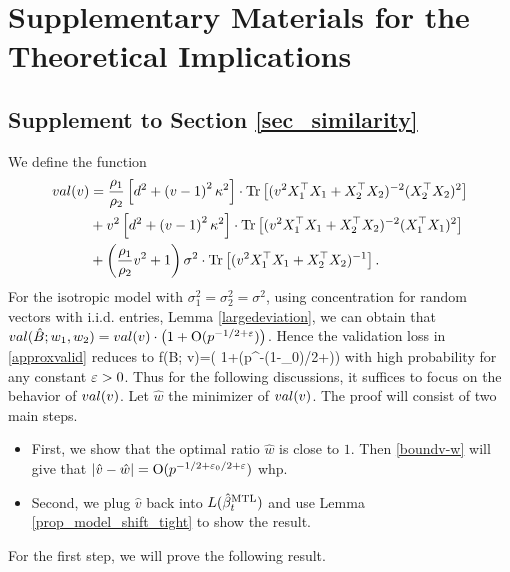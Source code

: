 \section{Supplementary Materials for the Theoretical Implications}

\subsection{Supplement to Section \ref{sec_similarity}}\label{app_proof_31}

We define the function
\begin{align}
	val(v) &= \frac{\rho_1}{\rho_2}\left[d^2 +\left( v-1\right)^2\kappa^2\right]\cdot \operatorname{Tr}\left[( v^2X_1^{\top}X_1 +X_2^{\top}X_2)^{-2} (X_2^{\top}X_2)^2\right] \nonumber \\
	& +  v^2\left[d^2 +\left( v-1\right)^2\kappa^2\right]\cdot \operatorname{Tr}\left[( v^2X_1^{\top}X_1 +X_2^{\top}X_2)^{-2} (X_1^{\top}X_1)^2\right] \nonumber\\
			& + \left(\frac{\rho_1}{\rho_2} v^2 + 1\right)\sigma^2 \cdot \operatorname{Tr}\left[(v^2X_1^{\top}X_1  + X_2^{\top}X_2)^{-1} \right]. \nonumber
\end{align}
For the isotropic model with $\sigma_1^2=\sigma_2^2=\sigma^2$, using concentration for random vectors with i.i.d. entries, Lemma \ref{largedeviation}, we can obtain that $val(\hat{B}; w_1, w_2)= val(v) \cdot \left( 1+\operatorname{O}(p^{-1/2+{\varepsilon}})\right)$. Hence the validation loss in \eqref{approxvalid} reduces to
\be\label{boundv-w}
\wt f(\hat B; v)=\cdot \left( 1+\OO(p^{-(1-\e_0)/2+\e})\right)
\ee
with high probability for any constant ${\varepsilon}>0$. \nc Thus for the following discussions, it suffices to focus on the behavior of $val (v)$. Let $\hat w$ the minimizer of $val(v)$. The proof will consist of two main steps.
\begin{itemize}
	\item First, we show that the optimal ratio $\hat{w}$ is close to $1$. Then \eqref{boundv-w} will give that $|\hat v - \hat w|=\operatorname{O}(p^{-1/2+{\varepsilon}_0/2+{\varepsilon}})$ whp.
	\item Second, we plug $\hat{v}$ back into $L(\hat{\beta}_t^{\text{MTL}})$ and use Lemma \ref{prop_model_shift_tight} to show the result.
\end{itemize}
For the first step, we will prove the following result. 
